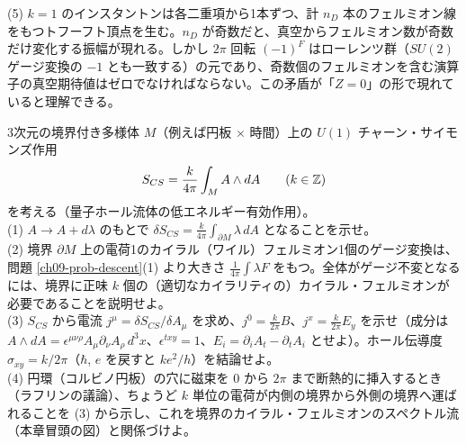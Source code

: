 \begin{solution}
(5) $k=1$ のインスタントンは各二重項から1本ずつ、計 $n_D$ 本のフェルミオン線をもつトフーフト頂点を生む。$n_D$ が奇数だと、真空からフェルミオン数が奇数だけ変化する振幅が現れる。しかし $2\pi$ 回転 $(-1)^F$ はローレンツ群（$SU(2)$ ゲージ変換の $-1$ とも一致する）の元であり、奇数個のフェルミオンを含む演算子の真空期待値はゼロでなければならない。この矛盾が「$Z=0$」の形で現れていると理解できる。
\end{solution}

\begin{problem}[難易度 D]\label{ch09-prob-inflow}
3次元の境界付き多様体 $M$（例えば円板 $\times$ 時間）上の $U(1)$ チャーン・サイモンズ作用
\[
S_{CS}=\frac{k}{4\pi}\int_MA\wedge dA\qquad(k\in\mathbb{Z})
\]
を考える（量子ホール流体の低エネルギー有効作用）。\\
(1) $A\to A+d\lambda$ のもとで $\delta S_{CS}=\frac{k}{4\pi}\int_{\partial M}\lambda\,dA$ となることを示せ。\\
(2) 境界 $\partial M$ 上の電荷1のカイラル（ワイル）フェルミオン1個のゲージ変換は、問題 \ref{ch09-prob-descent}(1) より大きさ $\frac{1}{4\pi}\int\lambda F$ をもつ。全体がゲージ不変となるには、境界に正味 $k$ 個の（適切なカイラリティの）カイラル・フェルミオンが必要であることを説明せよ。\\
(3) $S_{CS}$ から電流 $j^\mu=\delta S_{CS}/\delta A_\mu$ を求め、$j^0=\frac{k}{2\pi}B$、$j^x=\frac{k}{2\pi}E_y$ を示せ（成分は $A\wedge dA=\epsilon^{\mu\nu\rho}A_\mu\partial_\nu A_\rho\,d^3x$、$\epsilon^{txy}=1$、$E_i=\partial_iA_t-\partial_tA_i$ とせよ）。ホール伝導度 $\sigma_{xy}=k/2\pi$（$\hbar$, $e$ を戻すと $ke^2/h$）を結論せよ。\\
(4) 円環（コルビノ円板）の穴に磁束を $0$ から $2\pi$ まで断熱的に挿入するとき（ラフリンの議論）、ちょうど $k$ 単位の電荷が内側の境界から外側の境界へ運ばれることを (3) から示し、これを境界のカイラル・フェルミオンのスペクトル流（本章冒頭の図）と関係づけよ。
\end{problem}


